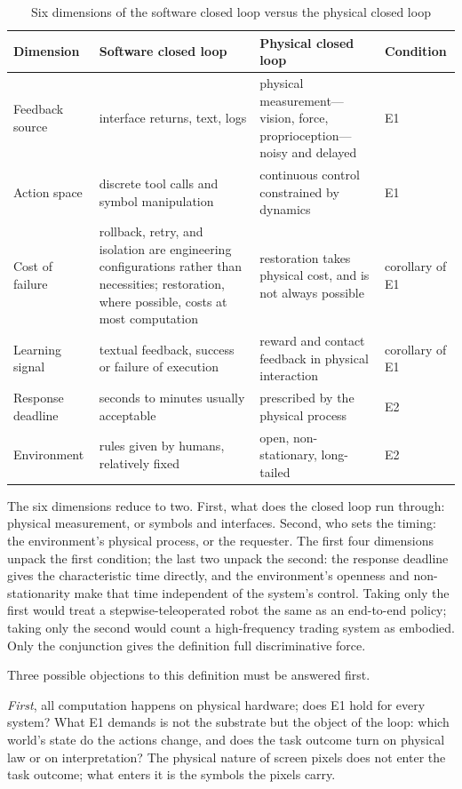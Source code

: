 \documentclass[10pt]{article}
\begin{document}
\begin{table}[htbp]
\centering
\caption{Six dimensions of the software closed loop versus the physical closed loop}
\label{tab:sixdimensions}
\small
\begin{tabularx}{\textwidth}{>{\raggedright\arraybackslash}p{1.9cm}YY>{\centering\arraybackslash}p{1.7cm}}
\toprule
Dimension & Software closed loop & Physical closed loop & Condition \\
\midrule
Feedback source & interface returns, text, logs & physical measurement---vision, force, proprioception---noisy and delayed & E1 \\
Action space & discrete tool calls and symbol manipulation & continuous control constrained by dynamics & E1 \\
Cost of failure & rollback, retry, and isolation are engineering configurations rather than necessities; restoration, where possible, costs at most computation & restoration takes physical cost, and is not always possible & corollary of E1 \\
Learning signal & textual feedback, success or failure of execution & reward and contact feedback in physical interaction & corollary of E1 \\
Response deadline & seconds to minutes usually acceptable & prescribed by the physical process & E2 \\
Environment & rules given by humans, relatively fixed & open, non-stationary, long-tailed & E2 \\
\bottomrule
\end{tabularx}
\end{table}

The six dimensions reduce to two. First, what does the closed loop run through: physical measurement, or symbols and interfaces. Second, who sets the timing: the environment's physical process, or the requester. The first four dimensions unpack the first condition; the last two unpack the second: the response deadline gives the characteristic time directly, and the environment's openness and non-stationarity make that time independent of the system's control. Taking only the first would treat a stepwise-teleoperated robot the same as an end-to-end policy; taking only the second would count a high-frequency trading system as embodied. Only the conjunction gives the definition full discriminative force.

Three possible objections to this definition must be answered first.

\textit{First}, all computation happens on physical hardware; does E1 hold for every system? What E1 demands is not the substrate but the object of the loop: which world's state do the actions change, and does the task outcome turn on physical law or on interpretation? The physical nature of screen pixels does not enter the task outcome; what enters it is the symbols the pixels carry.
\end{document}
